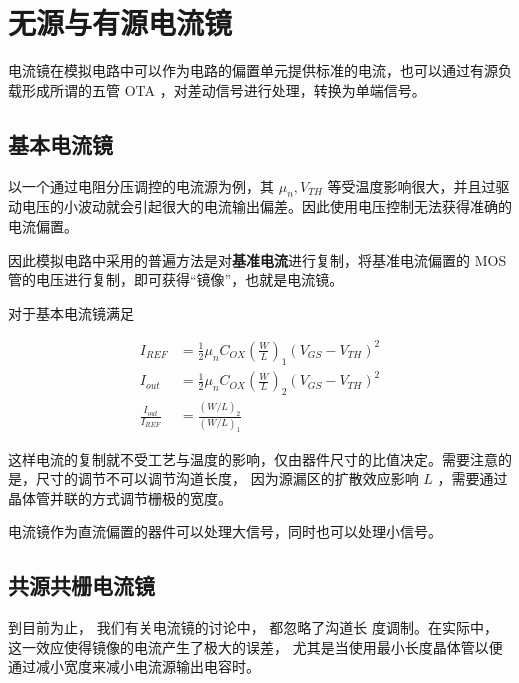 \documentclass[cn,11pt,chinese,black,simple]{../elegantbook}
\begin{document}
\fi 


\chapter{无源与有源电流镜}

电流镜在模拟电路中可以作为电路的偏置单元提供标准的电流，也可以通过有源负载形成所谓的五管 OTA ，对差动信号进行处理，转换为单端信号。

\section{基本电流镜}

以一个通过电阻分压调控的电流源为例，其 \(\mu_n , V_{TH}\) 等受温度影响很大，并且过驱动电压的小波动就会引起很大的电流输出偏差。因此使用电压控制无法获得准确的电流偏置。


因此模拟电路中采用的普遍方法是对\textbf{基准电流}进行复制，将基准电流偏置的 MOS 管的电压进行复制，即可获得“镜像”，也就是电流镜。


对于基本电流镜满足

\begin{equation}\label{eq:c4:1}
    \begin{aligned}
        I_{REF} &= \frac{1}{2} \mu_n C_{OX} \left(\frac{W}{L}\right)_1(V_{GS} - V_{TH})^2 \\
        I_{out} &= \frac{1}{2} \mu_n C_{OX} \left(\frac{W}{L}\right)_2(V_{GS} - V_{TH})^2 \\
        \frac{I_{out}}{I_{REF}} &= \frac{(W/L)_2}{(W/L)_1}
    \end{aligned}
\end{equation}


这样电流的复制就不受工艺与温度的影响，仅由器件尺寸的比值决定。需要注意的是，尺寸的调节不可以调节沟道长度， 因为源漏区的扩散效应影响 \(L\) ，需要通过晶体管并联的方式调节栅极的宽度。

电流镜作为直流偏置的器件可以处理大信号，同时也可以处理小信号。

\section{共源共栅电流镜}

到目前为止， 我们有关电流镜的讨论中， 都忽略了沟道长
度调制。在实际中， 这一效应使得镜像的电流产生了极大的误差， 尤其是当使用最小长度晶体管以便通过减小宽度来减小电流源输出电容时。
\end{document}
